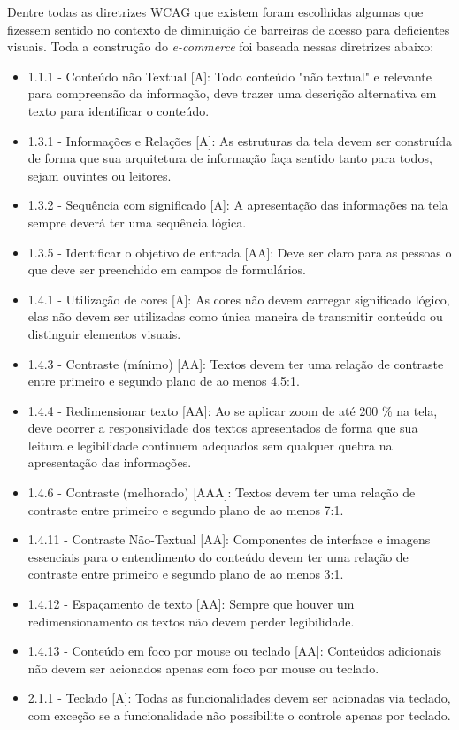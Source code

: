 {Dentre todas as diretrizes WCAG que existem foram escolhidas algumas que fizessem sentido no contexto de diminuição de barreiras de acesso para deficientes visuais. Toda a construção do \textit{e-commerce} foi baseada nessas diretrizes abaixo: 
\begin{itemize}
\item 1.1.1 - Conteúdo não Textual [A]: Todo conteúdo "não textual" e relevante para compreensão da informação, deve trazer uma descrição alternativa em texto para identificar o conteúdo.
\item 1.3.1 - Informações e Relações [A]: As estruturas da tela devem ser construída de forma que sua arquitetura de informação faça sentido tanto para todos, sejam ouvintes ou leitores.
\item 1.3.2 - Sequência com significado [A]: A apresentação das informações na tela sempre deverá ter uma sequência lógica.
\item 1.3.5 - Identificar o objetivo de entrada [AA]: Deve ser claro para as pessoas o que deve ser preenchido em campos de formulários.
\item 1.4.1 - Utilização de cores [A]: As cores não devem carregar significado lógico, elas não devem ser utilizadas como única maneira de transmitir conteúdo ou distinguir elementos visuais.
\item 1.4.3 - Contraste (mínimo) [AA]: Textos devem ter uma relação de contraste entre primeiro e segundo plano de ao menos 4.5:1.
\item 1.4.4 - Redimensionar texto [AA]: Ao se aplicar zoom de até 200 \% na tela, deve ocorrer a responsividade dos textos apresentados de forma que sua leitura e legibilidade continuem adequados sem qualquer quebra na apresentação das informações.
\item 1.4.6 - Contraste (melhorado) [AAA]: Textos devem ter uma relação de contraste entre primeiro e segundo plano de ao menos 7:1.
\item 1.4.11 - Contraste Não-Textual [AA]: Componentes de interface e imagens essenciais para o entendimento do conteúdo devem ter uma relação de contraste entre primeiro e segundo plano de ao menos 3:1.
\item 1.4.12 - Espaçamento de texto [AA]: Sempre que houver um redimensionamento os textos não devem perder legibilidade.
\item 1.4.13 - Conteúdo em foco por mouse ou teclado [AA]: Conteúdos adicionais não devem ser acionados apenas com foco por mouse ou teclado. 
\item 2.1.1 - Teclado [A]: Todas as funcionalidades devem ser acionadas via teclado, com exceção se a funcionalidade não possibilite o controle apenas por teclado.

\end{itemize}}
